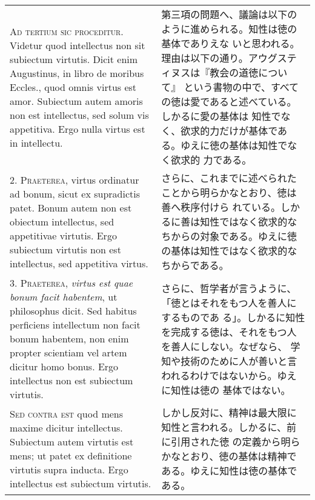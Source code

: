 \documentclass[10pt]{jsarticle}
\begin{document}
\begin{longtable}{p{21em}p{21em}}
{\scshape Ad tertium sic proceditur}. Videtur quod intellectus non sit
subiectum virtutis. Dicit enim Augustinus, in libro de moribus
Eccles., quod omnis virtus est amor. Subiectum autem amoris non est
intellectus, sed solum vis appetitiva. Ergo nulla virtus est in
intellectu.

&

第三項の問題へ、議論は以下のように進められる。知性は徳の基体でありえな
いと思われる。理由は以下の通り。アウグスティヌスは『教会の道徳について』
という書物の中で、すべての徳は愛であると述べている。しかるに愛の基体は
知性でなく、欲求的力だけが基体である。ゆえに徳の基体は知性でなく欲求的
力である。

\\

2. {\scshape Praeterea}, virtus ordinatur ad bonum, sicut ex supradictis
patet. Bonum autem non est obiectum intellectus, sed appetitivae
virtutis. Ergo subiectum virtutis non est intellectus, sed appetitiva
virtus.

&

さらに、これまでに述べられたことから明らかなとおり、徳は善へ秩序付けら
れている。しかるに善は知性ではなく欲求的なちからの対象である。ゆえに徳
の基体は知性ではなく欲求的なちからである。

\\



3. {\scshape Praeterea}, {\itshape virtus est quae bonum facit
habentem}, ut philosophus dicit. Sed habitus perficiens intellectum
non facit bonum habentem, non enim propter scientiam vel artem dicitur
homo bonus. Ergo intellectus non est subiectum virtutis.

&

さらに、哲学者が言うように、「徳とはそれをもつ人を善人にするものであ
る」。しかるに知性を完成する徳は、それをもつ人を善人にしない。なぜなら、
学知や技術のために人が善いと言われるわけではないから。ゆえに知性は徳の
基体ではない。

\\

{\scshape Sed contra est} quod mens maxime dicitur
intellectus. Subiectum autem virtutis est mens; ut patet ex
definitione virtutis supra inducta. Ergo intellectus est subiectum
virtutis.

&

しかし反対に、精神は最大限に知性と言われる。しかるに、前に引用された徳
の定義から明らかなとおり、徳の基体は精神である。ゆえに知性は徳の基体で
ある。


\end{longtable}
\end{document}
